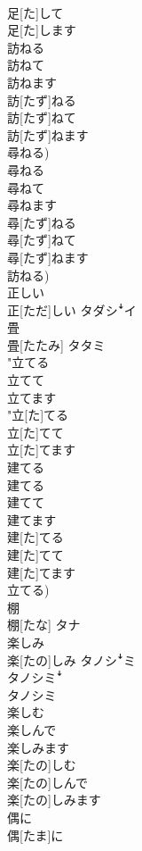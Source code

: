 \documentclass[8pt]{extreport}
\begin{document}
\begin{CJK}{UTF8}{min}
\\	足[た]して 
\\	足[た]します	
\\	訪ねる 
\\	訪ねて 
\\	訪ねます	
\\	訪[たず]ねる 
\\	訪[たず]ねて 
\\	訪[たず]ねます 
\\	尋ねる)	
\\	尋ねる 
\\	尋ねて 
\\	尋ねます	
\\	尋[たず]ねる 
\\	尋[たず]ねて 
\\	尋[たず]ねます 
\\	訪ねる)	
\\	正しい	
\\	正[ただ]しい	タダシꜜイ
\\	畳	
\\	畳[たたみ]	タタミ
\\	"立てる 
\\	立てて 
\\	立てます 
\\	"立[た]てる 
\\	立[た]てて 
\\	立[た]てます 
\\	建てる 
\\	建てる 
\\	建てて 
\\	建てます	
\\	建[た]てる 
\\	建[た]てて 
\\	建[た]てます 
\\	立てる)	
\\	棚	
\\	棚[たな]	タナ
\\	楽しみ	
\\	楽[たの]しみ	タノシꜜミ 
\\	タノシミꜜ 
\\	タノシミ
\\	楽しむ 
\\	楽しんで 
\\	楽しみます	
\\	楽[たの]しむ 
\\	楽[たの]しんで 
\\	楽[たの]しみます	
\\	偶に	
\\	偶[たま]に	

\end{CJK}
\end{document}

